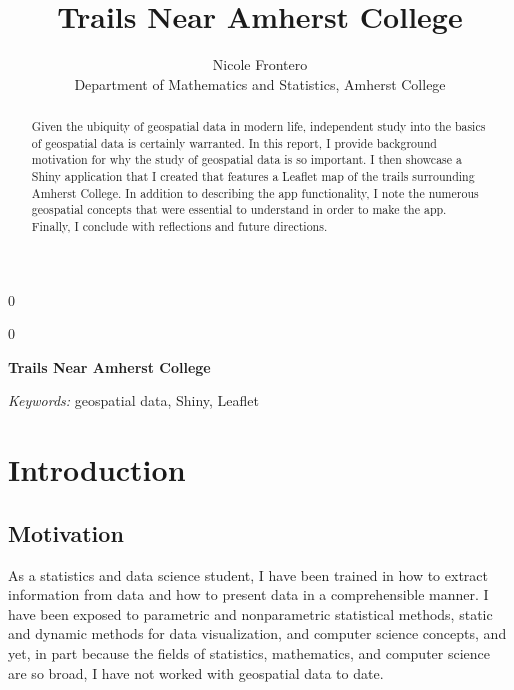 \documentclass[12pt]{article}
\newcommand{\blind}{0}
\begin{document}
\def\spacingset#1{\renewcommand{\baselinestretch}%
{#1}\small\normalsize} \spacingset{1}



\blind
{
  \title{\bf Trails Near Amherst College}

  \author{
        Nicole Frontero \\
    Department of Mathematics and Statistics, Amherst College\\
      }
  \maketitle
} \fi

\blind
{
  \bigskip
  \bigskip
  \bigskip
  \begin{center}
    {\LARGE\bf Trails Near Amherst College}
  \end{center}
  \medskip
} \fi

\bigskip
\begin{abstract}
Given the ubiquity of geospatial data in modern life, independent study
into the basics of geospatial data is certainly warranted. In this
report, I provide background motivation for why the study of geospatial
data is so important. I then showcase a Shiny application that I created
that features a Leaflet map of the trails surrounding Amherst College.
In addition to describing the app functionality, I note the numerous
geospatial concepts that were essential to understand in order to make
the app. Finally, I conclude with reflections and future directions.
\end{abstract}

\noindent%
{\it Keywords:} geospatial data, Shiny, Leaflet
\vfill

\newpage
\spacingset{1.45} %

\hypertarget{introduction}{%
\section{Introduction}\label{introduction}}

\hypertarget{motivation}{%
\subsection{Motivation}\label{motivation}}

As a statistics and data science student, I have been trained in how to
extract information from data and how to present data in a
comprehensible manner. I have been exposed to parametric and
nonparametric statistical methods, static and dynamic methods for data
visualization, and computer science concepts, and yet, in part because
the fields of statistics, mathematics, and computer science are so
broad, I have not worked with geospatial data to date.
\end{document}
